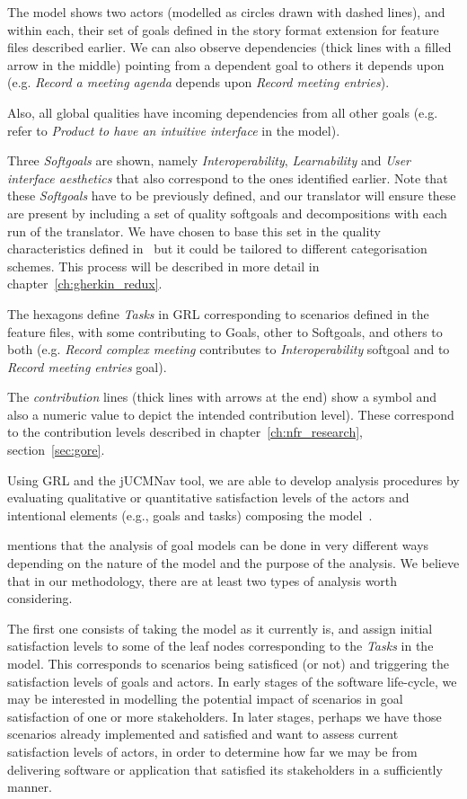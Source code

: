 \documentclass[dissertation,final]{softeng}
\begin{document}
The model shows two actors (modelled as circles drawn with dashed lines), and within each, their set of goals defined in the story format extension for feature files described earlier. We can also observe dependencies (thick lines with a filled arrow in the middle) pointing from a dependent goal to others it depends upon (e.g. \emph{Record a meeting agenda} depends upon \emph{Record meeting entries}). 

Also, all global qualities have incoming dependencies from all other goals (e.g. refer to \emph{Product to have an intuitive interface} in the model).

Three \emph{Softgoals} are shown, namely \emph{Interoperability}, \emph{Learnability} and \emph{User interface aesthetics} that also correspond to the ones identified earlier. Note that these \emph{Softgoals} have to be previously defined, and our translator will ensure these are present by including a set of quality softgoals and decompositions with each run of the translator. We have chosen to base this set in the quality characteristics defined in~\citet{ieee_std_25010} but it could be tailored to different categorisation schemes. This process will be described in more detail in chapter~\ref{ch:gherkin_redux}.

The hexagons define \emph{Tasks} in GRL corresponding to scenarios defined in the feature files, with some contributing to Goals,  other to Softgoals, and others to both (e.g. \emph{Record complex meeting} contributes to \emph{Interoperability} softgoal and to \emph{Record meeting entries} goal).

The \emph{contribution} lines (thick lines with arrows at the end) show a symbol and also a numeric value to depict the intended contribution level). These correspond to the contribution levels described in chapter~\ref{ch:nfr_research}, section~\ref{sec:gore}.

Using GRL and the jUCMNav tool, we are able to develop analysis procedures by evaluating qualitative or quantitative satisfaction levels of the actors and intentional elements (e.g., goals and tasks) composing the model~\citep{Amyot2010}.

\citet{Amyot2010} mentions that the analysis of goal models can be done in very different ways depending on the nature of the model and the purpose of the analysis. We believe that in our methodology, there are at least two types of analysis worth considering. 

The first one consists of taking the model as it currently is, and assign initial satisfaction levels to some of the leaf nodes corresponding to the \emph{Tasks} in the model. This corresponds to scenarios being satisficed (or not) and triggering the satisfaction levels of goals and actors. In early stages of the software life-cycle, we may be interested in modelling the potential impact of scenarios in goal satisfaction of one or more stakeholders. In later stages, perhaps we have those scenarios already implemented and satisfied and want to assess current satisfaction levels of actors, in order to determine how far we may be from delivering software or application that satisfied its stakeholders in a sufficiently manner.
\end{document}

